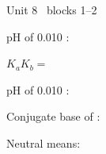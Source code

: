 \documentclass{apchem-worksheet}
\begin{document}
\begin{spiralstrip}{Unit 8 \textbullet\ blocks 1--2}
  \item pH of \SI{0.010}{\Molar} : 
  \item $K_aK_b = $ 
  \item pH of \SI{0.010}{\Molar} :
  \item Conjugate base of : 
  \item Neutral means: \answerblank[4cm]{$[\ce{H+}] = [\ce{OH-}]$}
\end{spiralstrip}
\end{document}
